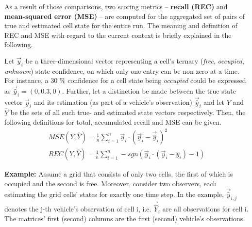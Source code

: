 As a result of those comparisons, two scoring metrics – \textbf{recall (REC)} and \textbf{mean-squared error (MSE)} – are computed for the aggregated set of  pairs of true and estimated cell state for the entire run. The meaning and definition of REC and MSE with regard to the current context is briefly explained in the following.
\par
\bigskip

Let $\vec{y}_i$ be a three-dimensional vector representing a cell's ternary (\textit{free}, \textit{occupied}, \textit{unknown}) state confidence, on which only one entry can be non-zero at a time. For instance, a 30 \% confidence for a cell state being \textit{occupied} could be expressed as $\vec{\hat{y}}_i = (0, 0.3, 0)$. Further, let a distinction be made between the true state vector $\vec{y}_i$ and its estimation (as part of a vehicle's observation) $\vec{\hat{y}}_i$ and let $Y$ and $\hat{Y}$ be the sets of all such true- and estimated state vectors respectively. Then, the following definitions for total, accumulated recall and MSE can be given.
\begin{gather}
	\textit{MSE}(Y, \hat{Y}) = \frac{1}{n} \sum_{i=1}^{n} \vec{y}_i \cdot (\vec{y}_i - \vec{\hat{y}}_i)^2 \\
	\textit{REC}(Y, \hat{Y}) = \frac{1}{n} \sum_{i=1}^{n} -\textit{sgn}(\vec{y}_i \cdot (\vec{y}_i - \hat{y}_i) - 1)
\end{gather}

\textbf{Example:} Assume a grid that consists of only two cells, the first of which is occupied and the second is free. Moreover, consider two observers, each estimating the grid cells' states for exactly one time step. In the example, $\vec{\hat{y}}_{i,j}$ denotes the j-th vehicle's observation of cell i, i.e. $\vec{\hat{Y}}_i$ are all observations for cell i. The matrices' first (second) columns are the first (second) vehicle's observations.


